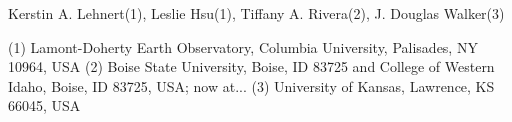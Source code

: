 Kerstin A. Lehnert(1), Leslie Hsu(1), Tiffany A. Rivera(2), J. Douglas Walker(3)

(1) Lamont-Doherty Earth Observatory, Columbia University, Palisades, NY 10964, USA
(2) Boise State University, Boise, ID 83725 and College of Western Idaho, Boise, ID 83725, USA; now at...
(3) University of Kansas, Lawrence, KS 66045, USA
